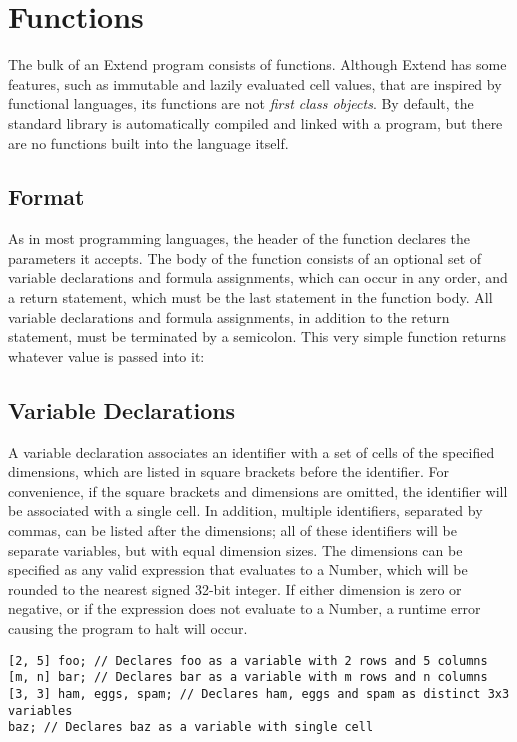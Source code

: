 \section{Functions}
\label{sec:Functions}
The bulk of an Extend program consists of functions. Although Extend has some features, such as immutable and lazily evaluated cell values, that are inspired by functional languages, its functions are not \textit{first class objects}. By default, the standard library is automatically compiled and linked with a program, but there are no functions built into the language itself.
\subsection{Format}
\label{sec:funcdecl}
As in most programming languages, the header of the function declares the parameters it accepts. The body of the function consists of an optional set of variable declarations and formula assignments, which can occur in any order, and a return statement, which must be the last statement in the function body. All variable declarations and formula assignments, in addition to the return statement, must be terminated by a semicolon.
This very simple function returns whatever value is passed into it:

\subsection{Variable Declarations}
\label{sec:vardecl}
A variable declaration associates an identifier with a set of cells of the specified dimensions, which are listed in square brackets before the identifier. For convenience, if the square brackets and dimensions are omitted, the identifier will be associated with a single cell. In addition, multiple identifiers, separated by commas, can be listed after the dimensions; all of these identifiers will be separate variables, but with equal dimension sizes. The dimensions can be specified as any valid expression that evaluates to a Number, which will be rounded to the nearest signed 32-bit integer. If either dimension is zero or negative, or if the expression does not evaluate to a Number, a runtime error causing the program to halt will occur.
\begin{lstlisting}
[2, 5] foo; // Declares foo as a variable with 2 rows and 5 columns
[m, n] bar; // Declares bar as a variable with m rows and n columns
[3, 3] ham, eggs, spam; // Declares ham, eggs and spam as distinct 3x3 variables
baz; // Declares baz as a variable with single cell
\end{lstlisting}
